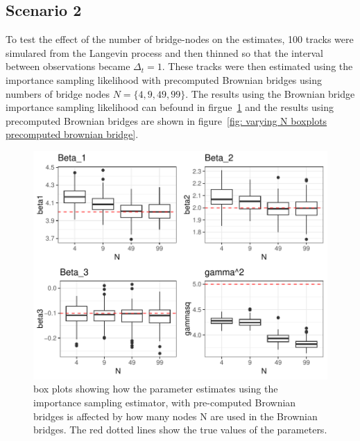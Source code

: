 \subsection{Scenario 2}
To test the effect of the number of bridge-nodes on the estimates, 100 tracks were simulared from the Langevin process and then thinned so that the interval between observations became $\Delta_t =1$. These tracks were then estimated using the importance sampling likelihood with precomputed Brownian bridges using numbers of bridge nodes $N =\{4,9,49,99\}$. The results using the Brownian bridge importance sampling likelihood can befound in firgue~\ref{fig: varying N boxplots brownian bridge} and the results using precomputed Brownian bridges are shown in figure~\ref{fig: varying N boxplots precomputed brownian bridge}. 

\begin{figure}[H]
    \centering
    \includegraphics[width=\linewidth]{Images/Results/varying N estimates.pdf}
    \caption[Box plots of Parameter Estimates for various Ns]{box plots showing how the parameter estimates using the importance sampling estimator, with pre-computed Brownian bridges is affected by how many nodes N are used in the Brownian bridges. The red dotted lines show the true values of the parameters.}
    \label{fig: varying N boxplots brownian bridge}
\end{figure}



